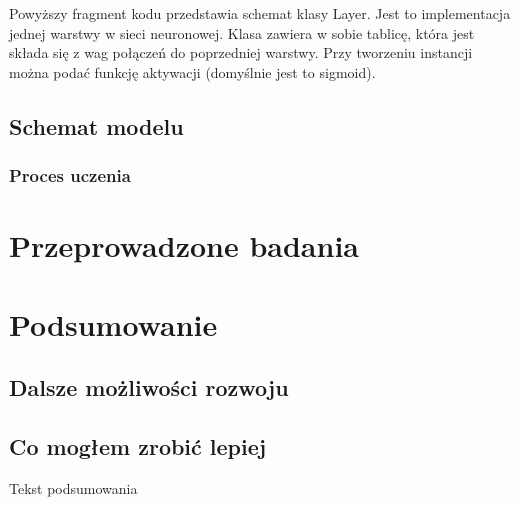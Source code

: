 \documentclass{report}
\begin{document}
    Powyższy fragment kodu przedstawia schemat klasy Layer.
    Jest to implementacja jednej warstwy w sieci neuronowej.
    Klasa zawiera w sobie tablicę, która jest składa się z wag połączeń do poprzedniej warstwy.
    Przy tworzeniu instancji można podać funkcję aktywacji (domyślnie jest to sigmoid).

    \section{Schemat modelu}

    \subsection{Proces uczenia}

    \chapter{Przeprowadzone badania}

    \chapter{Podsumowanie}

    \section{Dalsze możliwości rozwoju}

    \section{Co mogłem zrobić lepiej}

    Tekst podsumowania

    
    

    \listoffigures
    \listoftables
\end{document}
